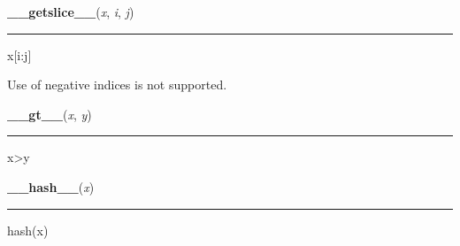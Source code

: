     \vspace{0.5ex}

    \begin{boxedminipage}{\textwidth}

    \raggedright \textbf{\_\_getslice\_\_}(\textit{x}, \textit{i}, \textit{j})

    \vspace{-1.5ex}

    \rule{\textwidth}{0.5\fboxrule}

x{[}i:j{]}

Use of negative indices is not supported.
    \vspace{1ex}

    \end{boxedminipage}

    \label{numpy:ndarray:__gt__}

    \vspace{0.5ex}

    \begin{boxedminipage}{\textwidth}

    \raggedright \textbf{\_\_gt\_\_}(\textit{x}, \textit{y})

    \vspace{-1.5ex}

    \rule{\textwidth}{0.5\fboxrule}

x{\textgreater}y
    \vspace{1ex}

    \end{boxedminipage}

    \label{object:__hash__}

    \vspace{0.5ex}

    \begin{boxedminipage}{\textwidth}

    \raggedright \textbf{\_\_hash\_\_}(\textit{x})

    \vspace{-1.5ex}

    \rule{\textwidth}{0.5\fboxrule}

hash(x)
    \vspace{1ex}

    \end{boxedminipage}

    \label{numpy:ndarray:__hex__}

